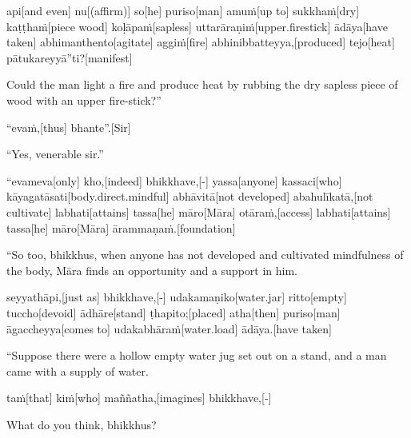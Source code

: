 \begin{samepage}
\begingl[glneveryline={\PaliGlossA,\PaliGlossB}]
api[and even] nu[(affirm)] so[he] puriso[man] amuṁ[up to] sukkhaṁ[dry] kaṭṭhaṁ[piece wood] koḷāpaṁ[sapless] uttarāraṇiṁ[upper.firestick] ādāya[have taken] abhimanthento[agitate] aggiṁ[fire] abhinibbatteyya,[produced] tejo[heat] pātukareyyā”ti?[manifest]
\endgl
\nopagebreak
\linespread{0.5}
\begin{spacin}{0.2}
{\PaliGlossFT Could the man light a fire and produce heat by rubbing the dry sapless piece of wood with an upper fire-stick?”}
\end{spacin}
\vskip 12pt
\end{samepage}
\begin{samepage}
\begingl[glneveryline={\PaliGlossA,\PaliGlossB}]
“evaṁ,[thus] bhante”.[Sir]
\endgl
\nopagebreak
\linespread{0.5}
\begin{spacin}{0.2}
{\PaliGlossFT “Yes, venerable sir.”}
\end{spacin}
\vskip 12pt
\end{samepage}
\begin{samepage}
\begingl[glneveryline={\PaliGlossA,\PaliGlossB}]
“evameva[only] kho,[indeed] bhikkhave,[-] yassa[anyone] kassaci[who] kāyagatāsati[body.direct.mindful] abhāvitā[not developed] abahulīkatā,[not cultivate] labhati[attains] tassa[he] māro[Māra] otāraṁ,[access] labhati[attains] tassa[he] māro[Māra] ārammaṇaṁ.[foundation]
\endgl
\nopagebreak
\linespread{0.5}
\begin{spacin}{0.2}
{\PaliGlossFT “So too, bhikkhus, when anyone has not developed and cultivated mindfulness of the body, Māra finds an opportunity and a support in him.}
\end{spacin}
\vskip 12pt
\end{samepage}
\begin{samepage}
\begingl[glneveryline={\PaliGlossA,\PaliGlossB}]
seyyathāpi,[just as] bhikkhave,[-] udakamaṇiko[water.jar] ritto[empty] tuccho[devoid] ādhāre[stand] ṭhapito;[placed] atha[then] puriso[man] āgaccheyya[comes to] udakabhāraṁ[water.load] ādāya.[have taken]
\endgl
\nopagebreak
\linespread{0.5}
\begin{spacin}{0.2}
{\PaliGlossFT “Suppose there were a hollow empty water jug set out on a stand, and a man came with a supply of water.}
\end{spacin}
\vskip 12pt
\end{samepage}
\begin{samepage}
\begingl[glneveryline={\PaliGlossA,\PaliGlossB}]
taṁ[that] kiṁ[who] maññatha,[imagines] bhikkhave,[-]
\endgl
\nopagebreak
\linespread{0.5}
\begin{spacin}{0.2}
{\PaliGlossFT What do you think, bhikkhus?}
\end{spacin}
\vskip 12pt
\end{samepage}
